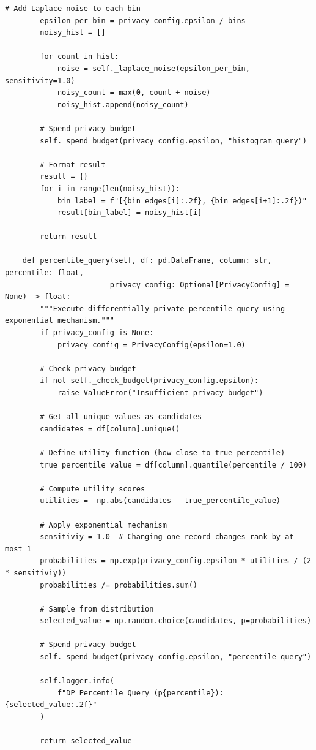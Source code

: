 \begin{lstlisting}[style=python, caption=PrivacyPreservingPipeline with Differential Privacy]
        # Add Laplace noise to each bin
        epsilon_per_bin = privacy_config.epsilon / bins
        noisy_hist = []

        for count in hist:
            noise = self._laplace_noise(epsilon_per_bin, sensitivity=1.0)
            noisy_count = max(0, count + noise)
            noisy_hist.append(noisy_count)

        # Spend privacy budget
        self._spend_budget(privacy_config.epsilon, "histogram_query")

        # Format result
        result = {}
        for i in range(len(noisy_hist)):
            bin_label = f"[{bin_edges[i]:.2f}, {bin_edges[i+1]:.2f})"
            result[bin_label] = noisy_hist[i]

        return result

    def percentile_query(self, df: pd.DataFrame, column: str, percentile: float,
                        privacy_config: Optional[PrivacyConfig] = None) -> float:
        """Execute differentially private percentile query using exponential mechanism."""
        if privacy_config is None:
            privacy_config = PrivacyConfig(epsilon=1.0)

        # Check privacy budget
        if not self._check_budget(privacy_config.epsilon):
            raise ValueError("Insufficient privacy budget")

        # Get all unique values as candidates
        candidates = df[column].unique()

        # Define utility function (how close to true percentile)
        true_percentile_value = df[column].quantile(percentile / 100)

        # Compute utility scores
        utilities = -np.abs(candidates - true_percentile_value)

        # Apply exponential mechanism
        sensitiviy = 1.0  # Changing one record changes rank by at most 1
        probabilities = np.exp(privacy_config.epsilon * utilities / (2 * sensitiviy))
        probabilities /= probabilities.sum()

        # Sample from distribution
        selected_value = np.random.choice(candidates, p=probabilities)

        # Spend privacy budget
        self._spend_budget(privacy_config.epsilon, "percentile_query")

        self.logger.info(
            f"DP Percentile Query (p{percentile}): {selected_value:.2f}"
        )

        return selected_value


\end{lstlisting}
